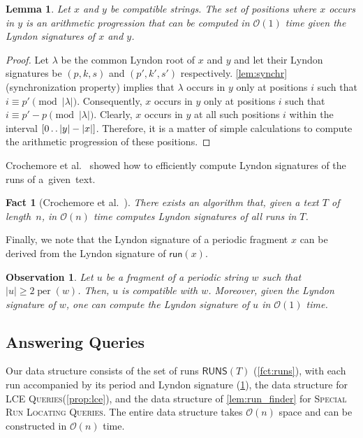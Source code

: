 \documentclass[a4paper]{article}
\newtheorem{fact}[theorem]{Fact}
\newtheorem{lemma}[theorem]{Lemma}
\newtheorem{observation}[theorem]{Observation}
\theoremstyle{definition}
\theoremstyle{remark}
\newcommand{\LCEQ}{\textsc{LCE Queries}\xspace}
\newcommand{\dd}{\mathinner{\ldotp\ldotp}}
\DeclareMathOperator{\per}{per}
\newcommand{\maybeqed}{}
\newcommand{\RUNS}{\mathsf{RUNS}}
\newcommand{\Oh}{\mathcal{O}}
\newcommand{\run}{\mathsf{run}}
\begin{document}
\begin{lemma}\label{lem:lyndon}
Let $x$ and $y$ be compatible strings.
The set of positions where $x$ occurs in $y$ is an arithmetic progression that
can be computed in $\Oh(1)$ time given the Lyndon signatures of $x$ and $y$.
\end{lemma}
\begin{proof}
Let $\lambda$ be the common Lyndon root of $x$ and $y$
and let their Lyndon signatures be $(p, k, s)$ and $(p', k', s')$ respectively.
\cref{lem:synchr} (synchronization property) implies that $\lambda$ occurs in $y$
only at positions $i$ such that $i\equiv p'\pmod{|\lambda|}$.
Consequently, $x$ occurs in $y$ only at positions $i$ such that $i\equiv p'-p\pmod{|\lambda|}$.
Clearly, $x$ occurs in $y$ at all such positions $i$ within the interval $[0\dd |y|-|x|]$.
Therefore, it is a matter of simple calculations to compute the arithmetic progression of these positions.
\maybeqed \end{proof}

Crochemore et al.~\cite{DBLP:journals/tcs/CrochemoreIKRRW14} showed how to efficiently compute
Lyndon signatures of the runs of a~given~text.

\begin{fact}[Crochemore et al.~\cite{DBLP:journals/tcs/CrochemoreIKRRW14}]\label{fct:compat}
There exists an algorithm that, given a text $T$ of length~$n$, in $\Oh(n)$ time
computes Lyndon signatures of all runs in $T$.
\end{fact}

Finally, we note that the Lyndon signature of a periodic fragment $x$ 
can be derived from the Lyndon signature of $\run(x)$.
\begin{observation}\label{obs:compat}
Let $u$ be a fragment of a periodic string $w$ such that  $|u|\ge 2\per(w)$.
Then, $u$ is compatible with $w$.
Moreover, given the Lyndon signature of $w$, one can compute the Lyndon signature of $u$ in $\Oh(1)$ time.
\end{observation}

\subsection{Answering Queries}\label{sec:per_sum}

Our data structure consists of the set of runs $\RUNS(T)$ (\cref{fct:runs}), with each run accompanied by its period and Lyndon signature (\cref{fct:compat}), the data structure for \LCEQ (\cref{prop:lce}), and the data structure of \cref{lem:run_finder} for \textsc{Special Run Locating Queries}.
The entire data structure takes $\Oh(n)$ space and can be constructed in $\Oh(n)$ time.
\end{document}
